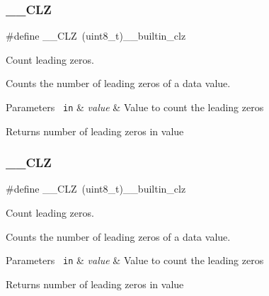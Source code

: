 \subsubsection{\texorpdfstring{\_\_CLZ}{\_\_CLZ}\hspace{0.1cm}{\footnotesize\ttfamily [2/3]}}
{\footnotesize\ttfamily \#define \+\_\+\+\_\+\+C\+LZ~(uint8\+\_\+t)\+\_\+\+\_\+builtin\+\_\+clz}



Count leading zeros. 

Counts the number of leading zeros of a data value. 
\begin{DoxyParams}[1]{Parameters}
\mbox{\texttt{ in}}  & {\em value} & Value to count the leading zeros \\
\hline
\end{DoxyParams}
\begin{DoxyReturn}{Returns}
number of leading zeros in value 
\end{DoxyReturn}
\mbox{\label{group___c_m_s_i_s___core___instruction_interface_ga5d5bb1527e042be4a9fa5a33f65cc248}} 
\subsubsection{\texorpdfstring{\_\_CLZ}{\_\_CLZ}\hspace{0.1cm}{\footnotesize\ttfamily [3/3]}}
{\footnotesize\ttfamily \#define \+\_\+\+\_\+\+C\+LZ~(uint8\+\_\+t)\+\_\+\+\_\+builtin\+\_\+clz}



Count leading zeros. 

Counts the number of leading zeros of a data value. 
\begin{DoxyParams}[1]{Parameters}
\mbox{\texttt{ in}}  & {\em value} & Value to count the leading zeros \\
\hline
\end{DoxyParams}
\begin{DoxyReturn}{Returns}
number of leading zeros in value 
\end{DoxyReturn}
\mbox{\label{group___c_m_s_i_s___core___instruction_interface_ga671101179b5943990785f36f8c1e2269}} 

